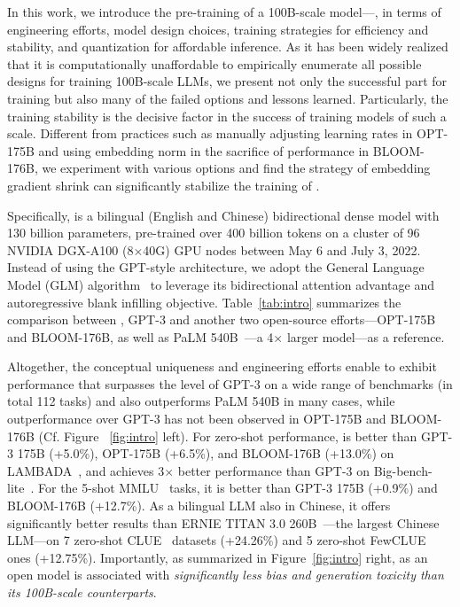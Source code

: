 In this work, we introduce the pre-training of a 100B-scale model---\glm, in terms of engineering efforts, model design choices, training strategies for efficiency and stability, and quantization for affordable inference. 
As it has been widely realized that it is computationally unaffordable to empirically enumerate all possible designs for training 100B-scale LLMs, we present not only the successful part for training \glm but also many of the failed options and lessons learned. 
Particularly, the training stability is {the} decisive factor in the success of training models of such a scale. 
Different from practices such as manually adjusting learning rates in OPT-175B and using embedding norm in the sacrifice of performance in BLOOM-176B, we experiment with various options and find the strategy of embedding gradient shrink can significantly stabilize the training of \glm.  

Specifically, \glm is a bilingual (English and Chinese) bidirectional dense model with 130 billion parameters, pre-trained over 400 billion tokens 
on a cluster of 96 NVIDIA DGX-A100 (8$\times$40G) GPU nodes 
between May 6 and July 3, 2022. 
Instead of using the GPT-style architecture, we adopt the  General Language Model (GLM) algorithm~\citep{du2022glm} to leverage its bidirectional attention advantage and autoregressive blank infilling objective. 
Table~\ref{tab:intro} summarizes the comparison between \glm, GPT-3 and another two open-source efforts---OPT-175B and BLOOM-176B, as well as PaLM 540B~\citep{chowdhery2022palm}---a 4$\times$ larger model---as a reference. 

Altogether, the conceptual uniqueness and engineering efforts enable \glm to exhibit performance that surpasses the level of GPT-3 on a wide range of benchmarks (in total 112 tasks) and also outperforms PaLM 540B in many cases, while outperformance over GPT-3 has not been observed in OPT-175B and BLOOM-176B (Cf. Figure ~\ref{fig:intro} left). 
For zero-shot performance, \glm is better than GPT-3 175B (+5.0\%), OPT-175B (+6.5\%), and BLOOM-176B (+13.0\%) on LAMBADA~\citep{paperno2016lambada}, and achieves 3$\times$ better performance than GPT-3 on Big-bench-lite~\citep{srivastava2022beyond}. 
For the 5-shot MMLU~\citep{hendrycks2021measuring} tasks, it is  better than GPT-3 175B (+0.9\%) and BLOOM-176B (+12.7\%). 
As a bilingual LLM also in Chinese, it offers significantly better results than ERNIE TITAN 3.0 260B~\citep{wang2021ernie}---the largest Chinese LLM---on 7 zero-shot CLUE~\citep{xu2020clue} datasets (+24.26\%) and 5 zero-shot FewCLUE~\citep{xu2021fewclue} ones (+12.75\%). 
Importantly, as summarized in Figure~\ref{fig:intro} right, \glm as an open model is associated with \textit{significantly less bias and generation toxicity than its 100B-scale counterparts}. 

